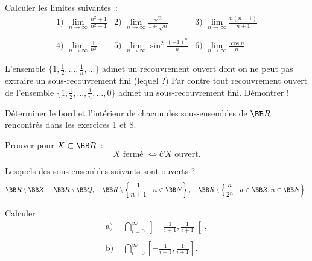 \documentclass[12pt,french,oneside,a4paper]{memoir} %
\begin{document}
\begin{exo}
Calculer les limites suivantes~:
\begin{equation*}
\begin{array}{lll}
\mbox{1) } \displaystyle{\lim_{n \rightarrow \infty} \frac{n^2+1}{n^2-1}} 
& \mbox{2) } \displaystyle{\lim_{n \rightarrow \infty} \frac{\sqrt{2}}{1+ \sqrt{n}}} 
& \mbox{3) } \displaystyle{\lim_{n \rightarrow \infty} \frac{n(n-1)}{n+1}} \\
&& \\
\mbox{4) } \displaystyle{\lim_{n \rightarrow \infty} \frac{1}{n^2}}
& \mbox{5) } \displaystyle{\lim_{n \rightarrow \infty} \sin^2 \frac{(-1)^n}{n}} 
& \mbox{6) } \displaystyle{\lim_{n \rightarrow \infty} \frac{\cos n }{n}}
\end{array}
\end{equation*}
\end{exo}
\begin{exo}
L'ensemble $\displaystyle{\{1, \frac{1}{2}, \ldots, \frac{1}{n}, \ldots \}}$
admet un recouvrement ouvert dont on ne peut pas extraire un sous-recouvrement fini
(lequel ?) Par contre tout recouvrement ouvert de l'ensemble 
$\displaystyle{\{1, \frac{1}{2}, \ldots, \frac{1}{n}, \ldots,0 \}}$ admet un sous-recouvrement
fini. Démontrer !
\end{exo}
\begin{exo}
Déterminer le bord et l'intérieur de chacun des sous-ensembles de 
${\BB R}$ rencontrés dans les exercices 1 et 8.
\end{exo}
\begin{exo}
Prouver pour $X \subset {\BB R}$~:
\begin{equation*}
X \mbox{ fermé } \Longleftrightarrow \mathcal{C}X \mbox{ ouvert}.
\end{equation*}
\end{exo}
\begin{exo}
Lesquels des sous-ensembles suivants sont ouverts ?
\begin{equation*}
{\BB R} \setminus {\BB Z},\quad \BB R \setminus \BB Q, \quad 
{\BB R} \setminus \left\{\dfrac{1}{n+1} \mid n \in 
{\BB N} \right\}, \quad {\BB R} \setminus \left\{ \frac{a}{2^n} \mid a \in {\BB Z}, 
n \in {\BB N}\right\}.
\end{equation*}
\end{exo}
\begin{exo}
Calculer
\begin{equation*}
\begin{array}{ll}
\mbox{a) } &\displaystyle{\bigcap_{i=0}^\infty \left]- \frac{1}{i+1} , \frac{1}{i+1}\right[,} \\
 & \\
\mbox{b) } &\displaystyle{\bigcap_{i=0}^\infty \left[- \frac{1}{i+1} , \frac{1}{i+1}\right].}
\end{array}
\end{equation*}
\end{exo}
\end{document}
